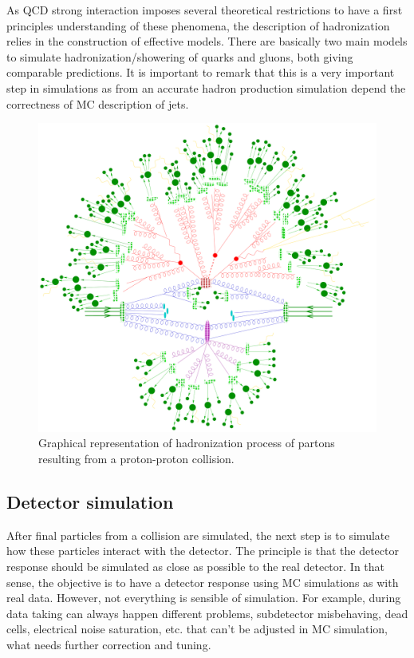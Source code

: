 As QCD strong interaction imposes several theoretical restrictions to have a first principles understanding of these phenomena, the description of hadronization relies in the construction of effective models. There are basically two main models to simulate hadronization/showering of quarks and gluons, both giving comparable predictions. It is important to remark that this is a very important step in simulations as from an accurate hadron production simulation depend the correctness of MC description of jets.

\begin{figure}[!Hhtbp]
  \begin{center}
    \includegraphics[width=\textwidth]{figs/parton_shower.png}
    \caption{Graphical representation of hadronization process of partons resulting from a proton-proton collision.}
    \label{fig:Hadr}
  \end{center}
\end{figure}

\subsection{Detector simulation}
\label{sec:detector}

After final particles from a collision are simulated, the next step is to simulate how these particles interact with the detector. The principle is that the detector response should be simulated as close as possible to the real detector. In that sense, the objective is to have a detector response using MC simulations as with real data. However, not everything is sensible of simulation. For example, during data taking can always happen different problems, subdetector misbehaving, dead cells, electrical noise saturation, etc. that can't be adjusted in MC simulation, what needs further correction and tuning. 

